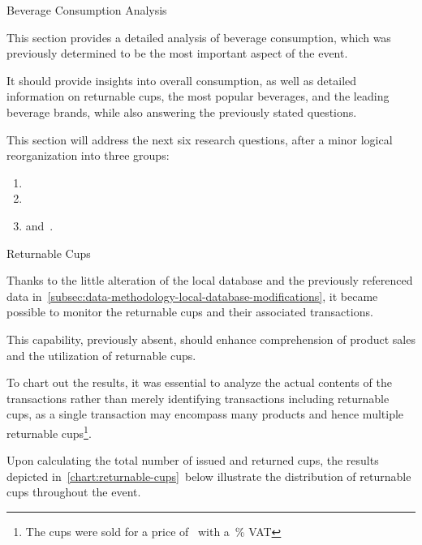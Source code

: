 \begin{section}{Beverage Consumption Analysis}
	\label{sec:analysis-beverage-consumption}

	This section provides a detailed analysis of beverage consumption, which was previously determined to be the most important aspect of the event.

	It should provide insights into overall consumption, as well as detailed information on returnable cups, the most popular beverages, and the leading beverage brands, while also answering the previously stated questions.

	This section will address the next six research questions, after a minor logical reorganization into three groups:
	\begin{enumerate}
		\item {}
		\item {}
		\item and~.
	\end{enumerate}

	\begin{subsection}{Returnable Cups}
		\label{subsec:analysis-beverage-returnable-cups}

		Thanks to the little alteration of the local database and the previously referenced data in~\autoref{subsec:data-methodology-local-database-modifications}, it became possible to monitor the returnable cups and their associated transactions.

		This capability, previously absent, should enhance comprehension of product sales and the utilization of returnable cups.


		To chart out the results, it was essential to analyze the actual contents of the transactions rather than merely identifying transactions including returnable cups,
		as a single transaction may encompass many products and hence multiple returnable cups\footnote{The cups were sold for a price of~ with a~\% VAT}.

		Upon calculating the total number of issued and returned cups, the results depicted in~\autoref{chart:returnable-cups}~below illustrate the distribution of returnable cups throughout the event.


\end{subsection}
\end{section}
